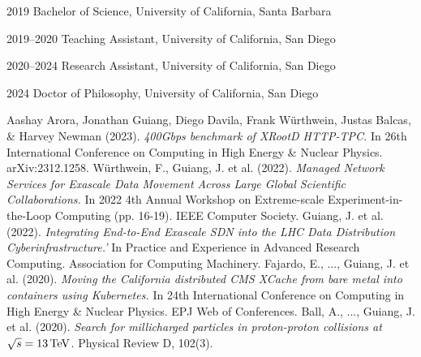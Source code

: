 \begin{vita}
\noindent
\begin{cv}{}
\begin{cvlist}{}
\item[2019] Bachelor of Science, University of California, Santa Barbara
\item[2019--2020] Teaching Assistant, University of California, San Diego
\item[2020--2024] Research Assistant, University of California, San Diego
\item[2024] Doctor of Philosophy, University of California, San Diego
\end{cvlist}
\end{cv}

\publications
\noindent Aashay Arora, Jonathan Guiang, Diego Davila, Frank Würthwein, Justas Balcas, \& Harvey Newman (2023). 
\textit{400Gbps benchmark of XRootD HTTP-TPC.}
In 26th International Conference on Computing in High Energy \& Nuclear Physics. arXiv:2312.1258.
\newline
\newline
\noindent W\"urthwein, F., Guiang, J. et al. (2022). 
\textit{Managed Network Services for Exascale Data Movement Across Large Global Scientific Collaborations.}
In 2022 4th Annual Workshop on Extreme-scale Experiment-in-the-Loop Computing (pp. 16-19). IEEE Computer Society.
\newline
\newline
\noindent Guiang, J. et al. (2022). 
\textit{Integrating End-to-End Exascale SDN into the LHC Data Distribution Cyberinfrastructure.'}
In Practice and Experience in Advanced Research Computing. Association for Computing Machinery.
\newline
\newline
\noindent Fajardo, E., ..., Guiang, J. et al. (2020). 
\textit{Moving the California distributed CMS XCache from bare metal into containers using Kubernetes.}
In 24th International Conference on Computing in High Energy \& Nuclear Physics. EPJ Web of Conferences.
\newline
\newline
\noindent Ball, A., ..., Guiang, J. et al. (2020). 
\textit{Search for millicharged particles in proton-proton collisions at $\sqrt{s} = 13 \,\text{Te\hspace{-.08em}V}$.}
Physical Review D, 102(3).
\end{vita}
